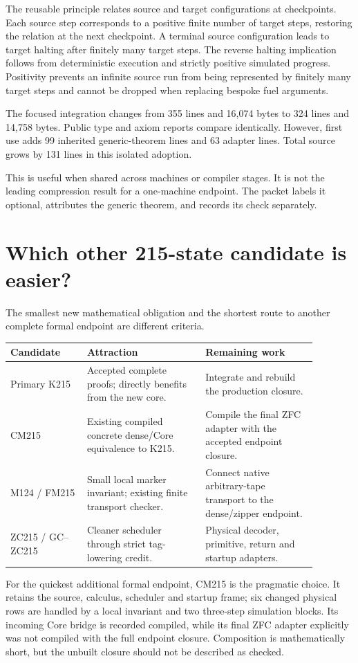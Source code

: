 \documentclass[11pt]{article}
\theoremstyle{definition}\newtheorem{definition}[theorem]{Definition}
\newcommand{\code}[1]{\texttt{\detokenize{#1}}}
\begin{document}
The reusable principle relates source and target configurations at checkpoints. Each source step corresponds to a positive finite number of target steps, restoring the relation at the next checkpoint. A terminal source configuration leads to target halting after finitely many target steps. The reverse halting implication follows from deterministic execution and strictly positive simulated progress. Positivity prevents an infinite source run from being represented by finitely many target steps and cannot be dropped when replacing bespoke fuel arguments.

The focused integration changes \code{KSim.lean} from 355 lines and 16,074 bytes to 324 lines and 14,758 bytes. Public type and axiom reports compare identically. However, first use adds 99 inherited generic-theorem lines and 63 adapter lines. Total source grows by 131 lines in this isolated adoption.

This is useful when shared across machines or compiler stages. It is not the leading compression result for a one-machine endpoint. The packet labels it optional, attributes the generic theorem, and records its check separately.

\section{Which other 215-state candidate is easier?}
The smallest new mathematical obligation and the shortest route to another complete formal endpoint are different criteria.
\begin{center}
\begin{tabular}{P{0.22\linewidth}P{0.34\linewidth}P{0.32\linewidth}}
\toprule
Candidate & Attraction & Remaining work\\
\midrule
Primary K215 & Accepted complete proofs; directly benefits from the new core. & Integrate and rebuild the production closure.\\
CM215 & Existing compiled concrete dense/Core equivalence to K215. & Compile the final ZFC adapter with the accepted endpoint closure.\\
M124 / FM215 & Small local marker invariant; existing finite transport checker. & Connect native arbitrary-tape transport to the dense/zipper endpoint.\\
ZC215 / GC--ZC215 & Cleaner scheduler through strict tag-lowering credit. & Physical decoder, primitive, return and startup adapters.\\
\bottomrule
\end{tabular}
\end{center}
For the quickest additional formal endpoint, CM215 is the pragmatic choice. It retains the source, calculus, scheduler and startup frame; six changed physical rows are handled by a local invariant and two three-step simulation blocks. Its incoming Core bridge is recorded compiled, while its final ZFC adapter explicitly was not compiled with the full endpoint closure. Composition is mathematically short, but the unbuilt closure should not be described as checked.
\end{document}
